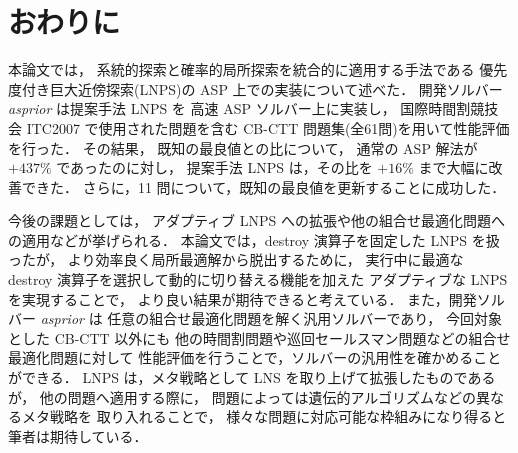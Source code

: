 \chapter{おわりに}

本論文では，
系統的探索と確率的局所探索を統合的に適用する手法である
優先度付き巨大近傍探索(LNPS)の ASP 上での実装について述べた．
開発ソルバー \textit{asprior} は提案手法 LNPS を
高速 ASP ソルバー{\clingo}上に実装し，
国際時間割競技会 ITC2007 で使用された問題を含む
 CB-CTT 問題集(全61問)を用いて性能評価を行った．
その結果，
既知の最良値との比について，
通常の ASP 解法が $+437\%$ であったのに対し，
提案手法 LNPS は，その比を $+16\%$ まで大幅に改善できた．
さらに，11 問について，既知の最良値を更新することに成功した．

今後の課題としては，
アダプティブ LNPS への拡張や他の組合せ最適化問題への適用などが挙げられる．
本論文では，destroy 演算子を固定した LNPS を扱ったが，
より効率良く局所最適解から脱出するために，
実行中に最適な destroy 演算子を選択して動的に切り替える機能を加えた
アダプティブな LNPS を実現することで，
より良い結果が期待できると考えている．
また，開発ソルバー \textit{asprior} は
任意の組合せ最適化問題を解く汎用ソルバーであり，
今回対象とした CB-CTT 以外にも
他の時間割問題や巡回セールスマン問題などの組合せ最適化問題に対して
性能評価を行うことで，ソルバーの汎用性を確かめることができる．
LNPS は，メタ戦略として LNS を取り上げて拡張したものであるが，
他の問題へ適用する際に，
問題によっては遺伝的アルゴリズムなどの異なるメタ戦略を
取り入れることで，
様々な問題に対応可能な枠組みになり得ると筆者は期待している．

